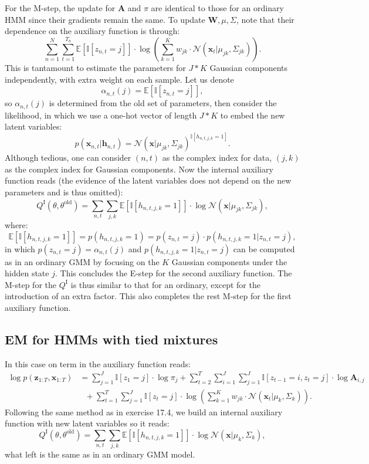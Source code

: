 \documentclass[UTF8]{ctexart}
\begin{document}
For the M-step, the update for $\textbf{A}$ and $\pi$ are identical to those for an ordinary HMM since their gradients remain the same. 
To update $\textbf{W},\mu,\Sigma$, note that their dependence on the auxiliary function is through:
$$\sum_{n=1}^{N}\sum_{t=1}^{T_{n}}\mathbb{E}[\mathbb{I}[z_{n,t}=j]]\cdot \log \left(\sum_{k=1}^{K}w_{jk}\cdot\mathcal{N}(\textbf{x}_{t}|\mu_{jk},\Sigma_{jk}) \right).$$
This is tantamount to estimate the parameters for $J*K$ Gaussian components independently, with extra weight on each sample. 
Let us denote
$$\alpha_{n,t}(j)=\mathbb{E}[\mathbb{I}[z_{n,t}=j]],$$
so $\alpha_{n,t}(j)$ is determined from the old set of parameters, then consider the likelihood, in which we use a one-hot vector of length $J*K$ to embed the new latent variables:
$$p(\textbf{x}_{n,t}|\textbf{h}_{n,t})=\mathcal{N}(\textbf{x}|\mu_{jk},\Sigma_{jk})^{\mathbb{I}[h_{n,t,j,k}=1]}.$$
Although tedious, one can consider $(n,t)$ as the complex index for data, $(j,k)$ as the complex index for Gaussian components. 
Now the internal auxiliary function reads (the evidence of the latent variables does not depend on the new parameters and is thus omitted):
$$Q^{\text{I}}(\theta,\theta^{\text{old}})= \sum_{n,t}\sum_{j,k}\mathbb{E}[\mathbb{I}[h_{n,t,j,k}=1]]\cdot\log \mathcal{N}(\textbf{x}|\mu_{jk},\Sigma_{jk}),$$
where:
$$\mathbb{E}[\mathbb{I}[h_{n,t,j,k}=1]]= p(h_{n,t,j,k}=1)=p(z_{n,t}=j)\cdot p(h_{n,t,j,k}=1|z_{n,t}=j),$$
in which $p(z_{n,t}=j)=\alpha_{n,t}(j)$ and $p(h_{n,t,j,k}=1|z_{n,t}=j)$ can be computed as in an ordinary GMM by focusing on the $K$ Gaussian components under the hidden state $j$. 
This concludes the E-step for the second auxiliary function. 
The M-step for the $Q^{\text{I}}$ is thus similar to that for an ordinary, except for the introduction of an extra factor.
This also completes the rest M-step for the first auxiliary function. 

\subsection{EM for HMMs with tied mixtures}
In this case on term in the auxiliary function reads:
$$
\begin{aligned}
\log p(\textbf{z}_{1:T},\textbf{x}_{1:T})&=\sum_{j=1}^{J}\mathbb{I}[z_{1}=j]\cdot \log \pi_{j}+\sum_{t=2}^{T}\sum_{i=1}^{J}\sum_{j=1}^{J}\mathbb{I}[z_{t-1}=i,z_{t}=j]\cdot\log \textbf{A}_{i,j} \\
&\ \ \ +\sum_{t=1}^{T}\sum_{j=1}^{J}\mathbb{I}[z_{t}=j]\cdot\log \left(\sum_{k=1}^{K}w_{jk}\cdot\mathcal{N}(\textbf{x}_{t}|\mu_{k},\Sigma_{k}) \right).
\end{aligned}
$$
Following the same method as in exercise 17.4, we build an internal auxiliary function with new latent variables so it reads:
$$Q^{\text{I}}(\theta,\theta^{\text{old}})= \sum_{n,t}\sum_{j,k}\mathbb{E}[\mathbb{I}[h_{n,t,j,k}=1]]\cdot\log \mathcal{N}(\textbf{x}|\mu_{k},\Sigma_{k}),$$
what left is the same as in an ordinary GMM model. 
\end{document}
